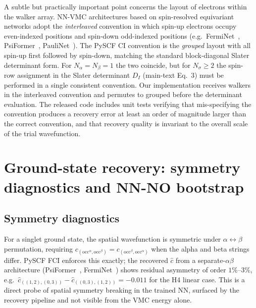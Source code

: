 \documentclass[journal=jctcce,manuscript=suppinfo,layout=traditional]{achemso}
\begin{document}
A subtle but practically important point concerns the layout of
electrons within the walker array. NN-VMC architectures based on
spin-resolved equivariant networks adopt the
\emph{interleaved} convention in which spin-up electrons occupy
even-indexed positions and spin-down odd-indexed positions
(e.g.\ FermiNet~\cite{Pfau2020FermiNet},
PsiFormer~\cite{vonGlehn2023PsiFormer},
PauliNet~\cite{Hermann2020PauliNet}). The PySCF CI convention is the
\emph{grouped} layout with all spin-up first followed by spin-down,
matching the standard block-diagonal Slater determinant form. For
$N_{\alpha} = N_{\beta} = 1$ the two coincide, but for
$N_{\sigma} \ge 2$ the spin-row assignment in the Slater determinant
$D_I$ (main-text Eq.~3) must be performed in a single consistent convention.
Our implementation receives walkers in the interleaved convention and
permutes to grouped before the determinant evaluation. The released
code includes unit tests verifying that mis-specifying the convention
produces a recovery error at least an order of magnitude larger than
the correct convention, and that recovery quality is invariant to the
overall scale of the trial wavefunction.

\section{Ground-state recovery: symmetry diagnostics and NN-NO bootstrap}
\label{sec:supp_groundstate}

\subsection{Symmetry diagnostics}
\label{sec:supp_symmetry_diag}

For a singlet ground state, the spatial wavefunction is symmetric
under $\alpha \leftrightarrow \beta$ permutation, requiring
$c_{(\mathrm{occ}^{\alpha}, \mathrm{occ}^{\beta})}
= c_{(\mathrm{occ}^{\beta}, \mathrm{occ}^{\alpha})}$ when the alpha and
beta strings differ. PySCF FCI enforces this exactly; the recovered
$\widehat{c}$ from a separate-$\alpha\beta$ architecture
(PsiFormer~\cite{vonGlehn2023PsiFormer},
FermiNet~\cite{Pfau2020FermiNet}) shows residual asymmetry of order
$1\%$--$3\%$, e.g.\ $\widehat{c}_{((1,2),(0,3))} - \widehat{c}_{((0,3),(1,2))}
= -0.011$ for the H4 linear case. This is a direct probe of spatial
symmetry breaking in the trained NN, surfaced by the recovery
pipeline and not visible from the VMC energy alone.
\end{document}
